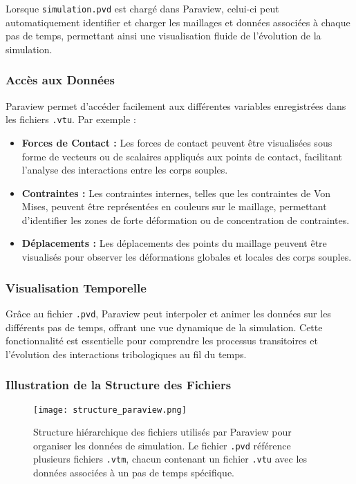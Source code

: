 Lorsque \texttt{simulation.pvd} est chargé dans Paraview, celui-ci peut automatiquement identifier et charger les maillages et données associées à chaque pas de temps, permettant ainsi une visualisation fluide de l'évolution de la simulation.

\subsubsection{Accès aux Données}

Paraview permet d'accéder facilement aux différentes variables enregistrées dans les fichiers \texttt{.vtu}. Par exemple :

\begin{itemize}
    \item \textbf{Forces de Contact :}  
    Les forces de contact peuvent être visualisées sous forme de vecteurs ou de scalaires appliqués aux points de contact, facilitant l'analyse des interactions entre les corps souples.
    
    \item \textbf{Contraintes :}  
    Les contraintes internes, telles que les contraintes de Von Mises, peuvent être représentées en couleurs sur le maillage, permettant d'identifier les zones de forte déformation ou de concentration de contraintes.
    
    \item \textbf{Déplacements :}  
    Les déplacements des points du maillage peuvent être visualisés pour observer les déformations globales et locales des corps souples.
\end{itemize}

\subsubsection{Visualisation Temporelle}

Grâce au fichier \texttt{.pvd}, Paraview peut interpoler et animer les données sur les différents pas de temps, offrant une vue dynamique de la simulation. Cette fonctionnalité est essentielle pour comprendre les processus transitoires et l'évolution des interactions tribologiques au fil du temps.

\subsubsection{Illustration de la Structure des Fichiers}

\begin{figure}[h]
    \centering
    \texttt{[image: structure\_paraview.png]}
    \caption{Structure hiérarchique des fichiers utilisés par Paraview pour organiser les données de simulation. Le fichier \texttt{.pvd} référence plusieurs fichiers \texttt{.vtm}, chacun contenant un fichier \texttt{.vtu} avec les données associées à un pas de temps spécifique.}
    \label{fig:structure_paraview}
\end{figure}

